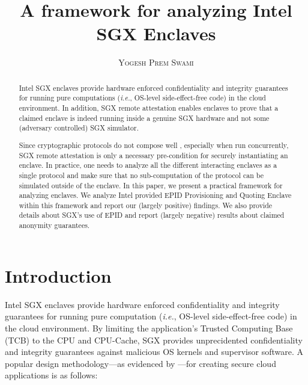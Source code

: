 \documentclass[10pt]{article}
\title{\bf A framework for analyzing Intel SGX Enclaves}
\author{\textsc{Yogesh Prem Swami}}
\date{\lastupdate}
\newcommand{\ie}{\textit{i.e.}}
\begin{document}

\maketitle

\begin{abstract}
  Intel SGX enclaves provide hardware enforced confidentiality and
  integrity guarantees for running pure computations (\ie, OS-level
  side-effect-free code) in the cloud environment. In addition, SGX
  remote attestation enables enclaves to prove that a claimed enclave
  is indeed running inside a genuine SGX hardware and not some
  (adversary controlled) SGX simulator.

  Since cryptographic protocols do not compose well
  \cite{ucframework}, especially when run concurrently, SGX remote
  attestation is only a necessary pre-condition for securely
  instantiating an enclave. In practice, one needs to analyze all the
  different interacting enclaves as a single protocol and make sure
  that no sub-computation of the protocol can be simulated outside of
  the enclave. In this paper, we present a practical framework for
  analyzing enclaves. We analyze Intel provided EPID\cite{epid}
  \textsf{Provisioning} and \textsf{Quoting} Enclave\cite{sgxattest}
  within this framework and report our (largely positive) findings. We
  also provide details about SGX's use of EPID and report (largely
  negative) results about claimed anonymity guarantees.

\end{abstract}

\section{Introduction}
\label{sec:intro}
  Intel SGX enclaves\cite{sgxinnov, sgxinnov2} provide hardware
  enforced confidentiality and integrity guarantees for running pure
  computation (\textit{i.e.}, OS-level side-effect-free code) in the
  cloud environment. By limiting the application's Trusted Computing
  Base (TCB) to the CPU and CPU-Cache, SGX provides unprecidented
  confidentiality and integrity guarantees against malicious OS
  kernels and supervisor software. A popular design methodology---as
  evidenced by \cite{Haven, Graphene, Scone}---for creating secure
  cloud applications is as follows:
\end{document}
